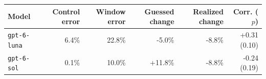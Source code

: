 \begin{tabular}{lrrrrr}
\toprule
Model & Control error & Window error & Guessed change & Realized change & Corr. ($p$) \\
\midrule
\texttt{gpt-6-luna} & 6.4\% & 22.8\% & -5.0\% & -8.8\% & +0.31 (0.10) \\
\texttt{gpt-6-sol} & 0.1\% & 10.0\% & +11.8\% & -8.8\% & -0.24 (0.19) \\
\bottomrule
\end{tabular}
